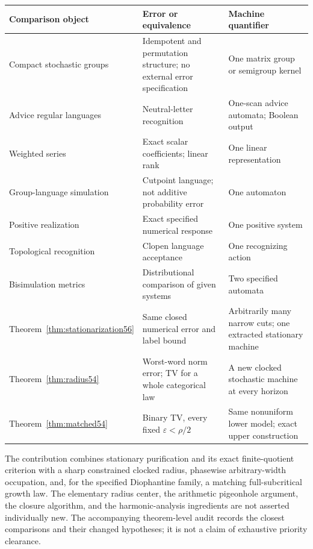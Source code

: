 \begin{center}\small
\begin{tabular}{>{\raggedright\arraybackslash}p{}>{\raggedright\arraybackslash}p{}>{\raggedright\arraybackslash}p{}}
\toprule
Comparison object & Error or equivalence & Machine quantifier\\
\midrule
Compact stochastic groups \cite{Flor} & Idempotent and permutation structure; no external error specification & One matrix group or semigroup kernel\\
Advice regular languages \cite{FP} & Neutral-letter recognition & One-scan advice automata; Boolean output\\
Weighted series \cite{BR} & Exact scalar coefficients; linear rank & One linear representation\\
Group-language simulation \cite{BP} & Cutpoint language; not additive probability error & One automaton\\
Positive realization \cite{BF04} & Exact specified numerical response & One positive system\\
Topological recognition \cite{Steinberg} & Clopen language acceptance & One recognizing action\\
Bisimulation metrics \cite{FSZ} & Distributional comparison of given systems & Two specified automata\\
Theorem~\ref{thm:stationarization56} & Same closed numerical error and label bound & Arbitrarily many narrow cuts; one extracted stationary machine\\
Theorem~\ref{thm:radius54} & Worst-word norm error; TV for a whole categorical law & A new clocked stochastic machine at every horizon\\
Theorem~\ref{thm:matched54} & Binary TV, every fixed $\varepsilon<\rho/2$ & Same nonuniform lower model; exact upper construction\\
\bottomrule
\end{tabular}
\end{center}
The contribution combines stationary purification and its exact finite-quotient criterion with a sharp constrained clocked radius, phasewise arbitrary-width occupation, and, for the specified Diophantine family, a matching full-subcritical growth law. The elementary radius center, the arithmetic pigeonhole argument, the closure algorithm, and the harmonic-analysis ingredients are not asserted individually new. The accompanying theorem-level audit records the closest comparisons and their changed hypotheses; it is not a claim of exhaustive priority clearance.


